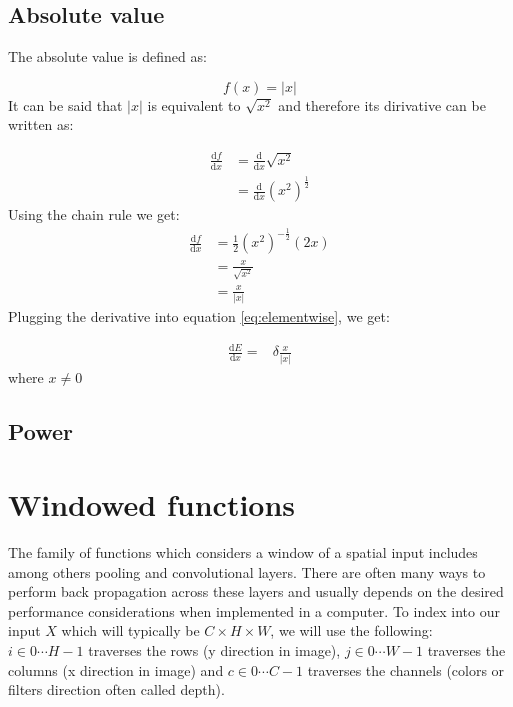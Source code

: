 \documentclass[a4paper]{article}
\begin{document}
\subsection{Absolute value}

The absolute value is defined as:

\begin{equation}
f(x)= |x|
\end{equation}
It can be said that $|x|$ is equivalent to $\sqrt{x^2}$ and therefore its dirivative can be written as:

\begin{align}
 \frac{\mathrm{d}f}{\mathrm{d}x} 
 &=  \frac{\mathrm{d}}{\mathrm{d}x}\sqrt{x^2} \\
 &=  \frac{\mathrm{d}}{\mathrm{d}x} (x^2)^\frac{1}{2}
\end{align}
Using the chain rule we get:
\begin{align}
\frac{\mathrm{d}f}{\mathrm{d}x} 
&=  \frac{1}{2}(x^2)^{-\frac{1}{2}}(2x) \\
&=  \frac{x}{\sqrt{x^2}} \\
&=  \frac{x}{|x|}
\end{align}
Plugging the derivative into equation \ref{eq:elementwise}, we get:

\begin{align}
\frac{\mathrm{d} E }{\mathrm{d} x}= &\delta \frac{x}{|x|}
\end{align}
where $x \neq 0$
\subsection{Power}

\newpage
\section{Windowed functions}
The family of functions which considers a window of a spatial input includes among others pooling and convolutional layers. There are often many ways to perform back propagation across these layers and usually depends on the desired performance considerations when implemented in a computer.  To index into our input $X$ which will typically be $C \times H \times W$, we will use the following: $i \in 0 \cdots H-1$ traverses the rows (y direction in image), $j \in 0 \cdots W-1$ traverses the columns (x direction in image) and $c \in 0 \cdots C-1$ traverses the channels (colors or filters direction often called depth).
\end{document}

